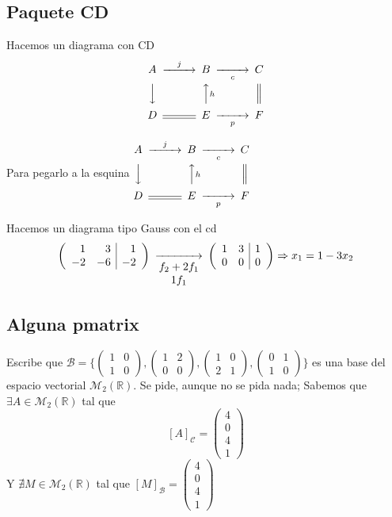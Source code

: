 \subsection{Paquete CD}
Hacemos un diagrama con CD
\[
\begin{CD} 
	A @>j>> B @>>c> C \\
	@VVV @AAhA @| \\
	D @= E @>>p> F 
\end{CD}
\]

Para pegarlo a la esquina
$\displaystyle \begin{CD}
	A @>j>> B @>>c> C \\
	@VVV @AAhA @| \\
	D @= E @>>p> F 
\end{CD}$

Hacemos un diagrama tipo Gauss con el cd
\[
\begin{CD}
	\left(\begin{array}{rr|r}
		1&3&1\\
		-2&-6&-2
	\end{array}\right) @>>{\begin{matrix}
			f_2+2f_1\\1f_1
	\end{matrix}}>
	\left(\begin{array}{rr|r}
		1&3&1\\
		0&0&0
	\end{array}\right) \Rightarrow x_1=1-3x_2
\end{CD}
\]

\subsection{Alguna pmatrix}

Escribe que $\mathcal{B} = \{
\begin{pmatrix}
	1 & 0 \\ 1 & 0
\end{pmatrix},
\begin{pmatrix}
	1 & 2 \\ 0 & 0
\end{pmatrix},
\begin{pmatrix}
	1 & 0 \\ 2 & 1
\end{pmatrix},
\begin{pmatrix}
	0 & 1 \\ 1 & 0
\end{pmatrix}	
\}$ es una base del espacio vectorial $\mathcal{M}_2(\mathbb{R})$. Se pide, aunque no se pida nada;
Sabemos que $\exists A \in \mathcal{M}_2(\mathbb{R})$ tal que 
\[[A]_{\mathcal{C}}=\begin{pmatrix} 
	4\\0\\4\\1
\end{pmatrix}
\]
Y $\nexists M \in \mathcal{M}_2(\mathbb{R})$ tal que $[M]_{\mathcal{B}}=\begin{pmatrix}
	4\\0\\4\\1
\end{pmatrix}$
\vspace{2cm}

